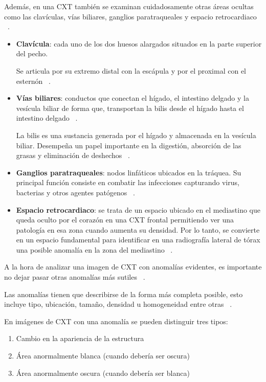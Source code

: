 Además, en una CXT también se examinan cuidadosamente otras áreas ocultas como las clavículas, vías biliares, ganglios paratraqueales y espacio retrocardiaco ~\cite{gelaw15}.

\begin{itemize}
    \item \textbf{Clavícula}: cada uno de los dos huesos alargados situados en la parte superior del pecho. 
    
    Se articula por su extremo distal con la escápula y por el proximal con el esternón ~\cite{CliUniNaClavicula24, RealAcaEsClavicula24}.
    \item \textbf{Vías biliares}: conductos que conectan el hígado, el intestino delgado y la vesícula biliar de forma que, transportan la bilis desde el hígado hasta el intestino delgado ~\cite{CliUniNabilis24}. 
    
    La bilis es una sustancia generada por el hígado y almacenada en la vesícula biliar. Desempeña un papel importante en la digestión, absorción de las grasas y eliminación de deshechos ~\cite{CliUniNabilis24}.
    \item \textbf{Ganglios paratraqueales}: nodos linfáticos ubicados en la tráquea. Su principal función consiste en combatir las infecciones capturando virus, bacterias y otros agentes patógenos ~\cite{MaCliGanLin24, imaiosGanLin24}.
    \item \textbf{Espacio retrocardiaco}: se trata de un espacio ubicado en el mediastino que queda oculto por el corazón en una CXT frontal permitiendo ver una patología en esa zona cuando aumenta su densidad. Por lo tanto, se convierte en un espacio fundamental para identificar en una radiografía lateral de tórax una posible anomalía en la zona del mediastino ~\cite{canals2022espacio}.
\end{itemize}

A la hora de analizar una imagen de CXT con anomalías evidentes, es importante no dejar pasar otras anomalías más sutiles ~\cite{gelaw15}.

Las anomalías tienen que describirse de la forma más completa posible, esto incluye tipo, ubicación, tamaño, densidad u homogeneidad entre otras ~\cite{gelaw15}.

En imágenes de CXT con una anomalía se pueden distinguir tres tipos: 

\begin{enumerate}
    \item Cambio en la apariencia de la estructura
    \item Área anormalmente blanca (cuando debería ser oscura)
    \item Área anormalmente oscura (cuando debería ser blanca)
\end{enumerate}

